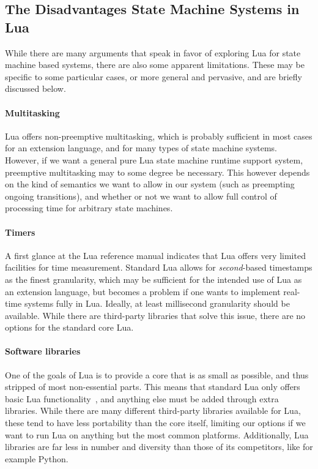 \subsection{The Disadvantages State Machine Systems in Lua}
\label{sec:lua_disadvantages}
While there are many arguments that speak in favor of exploring Lua for state machine based systems, there are also some apparent limitations. These may be specific to some particular cases, or more general and pervasive, and are briefly discussed below.

\paragraph{Multitasking}
Lua offers non-preemptive multitasking, which is probably sufficient in most cases for an extension language, and for many types of state machine systems. However, if we want a general pure Lua state machine runtime support system, preemptive multitasking may to some degree be necessary. This however depends on the kind of semantics we want to allow in our system (such as preempting ongoing transitions), and whether or not we want to allow full control of processing time for arbitrary state machines.

\paragraph{Timers}
A first glance at the Lua reference manual indicates that Lua offers very limited facilities for time measurement. Standard Lua allows for \emph{second}-based timestamps as the finest granularity, which may be sufficient for the intended use of Lua as an extension language, but becomes a problem if one wants to implement real-time systems fully in Lua. Ideally, at least millisecond granularity should be available. While there are third-party libraries that solve this issue, there are no options for the standard core Lua.

\paragraph{Software libraries}
One of the goals of Lua is to provide a core that is as small as possible, and thus stripped of most non-essential parts. This means that standard Lua only offers basic Lua functionality~\cite[Ch.6]{manual:lua_reference_manual}, and anything else must be added through extra libraries. While there are many different third-party libraries available for Lua, these tend to have less portability than the core itself, limiting our options if we want to run Lua on anything but the most common platforms. Additionally, Lua libraries are far less in number and diversity than those of its competitors, like for example Python.

